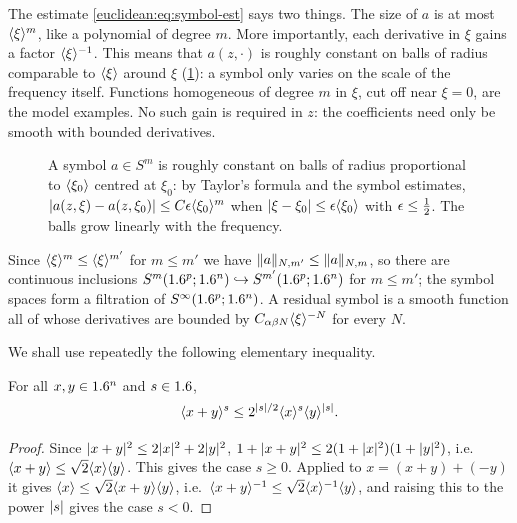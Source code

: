 \begin{discussion}
The estimate \eqref{euclidean:eq:symbol-est} says two things. The size of $a$ is at most
$\langle \xi\rangle^m$, like a polynomial of degree $m$. More importantly, each derivative in $\xi$
gains a factor $\langle \xi\rangle^{-1}$. This means that $a(z,\cdot)$ is roughly constant on balls
of radius comparable to $\langle \xi\rangle$ around $\xi$ (\cref{euclidean:fig:symbol-scale}): a
symbol only varies on the scale of the frequency itself. Functions homogeneous of
degree $m$ in $\xi$, cut off near $\xi=0$, are the model examples. No such gain is
required in $z$: the coefficients need only be smooth with bounded derivatives.
\end{discussion}

\begin{figure}[htbp]
\centering
{}
\caption{A symbol $a\in S^m$ is roughly constant on balls of radius proportional to
$\langle \xi_0\rangle$ centred at $\xi_0$: by Taylor's formula and the symbol estimates,
$\lvert a(z,\xi)-a(z,\xi_0)\rvert\le C\epsilon\langle \xi_0\rangle^m$ when $\lvert \xi-\xi_0\rvert\le\epsilon\langle \xi_0\rangle$
with $\epsilon\le\frac12$. The balls grow linearly with the frequency.}
\label{euclidean:fig:symbol-scale}
\end{figure}

Since $\langle \xi\rangle^{m}\le\langle \xi\rangle^{m'}$ for $m\le m'$ we have
$\lVert a\rVert_{N,m'}\le\lVert a\rVert_{N,m}$, so there are continuous inclusions
$S^m(1.6^p;1.6^n)\hookrightarrow S^{m'}(1.6^p;1.6^n)$ for $m\le m'$; the symbol
spaces form a filtration of $S^\infty(1.6^p;1.6^n)$. A residual symbol is a
smooth function all of whose derivatives are bounded by
$C_{\alpha\beta N}\langle \xi\rangle^{-N}$ for every $N$.

We shall use repeatedly the following elementary inequality.

\begin{lemma}\label{euclidean:lem:peetre}
  For all $x,y\in1.6^n$ and $s\in1.6$,
  \begin{equation*}
    \langle x+y\rangle^s\le2^{\lvert s\rvert/2}\langle x\rangle^s\langle y\rangle^{\lvert s\rvert}.
  \end{equation*}
\end{lemma}
\begin{proof}
  Since $\lvert x+y\rvert^2\le2\lvert x\rvert^2+2\lvert y\rvert^2$,
  $1+\lvert x+y\rvert^2\le2(1+\lvert x\rvert^2)(1+\lvert y\rvert^2)$, i.e.\
  $\langle x+y\rangle\le\sqrt2\langle x\rangle\langle y\rangle$. This gives the case $s\ge0$. Applied to
  $x=(x+y)+(-y)$ it gives $\langle x\rangle\le\sqrt2\langle x+y\rangle\langle y\rangle$, i.e.\
  $\langle x+y\rangle^{-1}\le\sqrt2\langle x\rangle^{-1}\langle y\rangle$, and raising this to the power
  $\lvert s\rvert$ gives the case $s<0$.
\end{proof}


